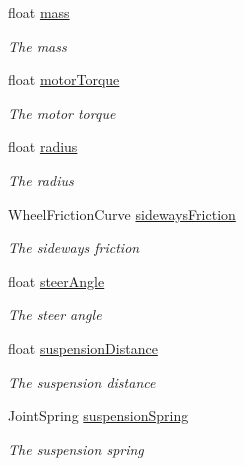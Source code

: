 \begin{DoxyCompactItemize}
float \hyperlink{class_serialize_wheel_collider_1_1_stored_information_a90f8bee727dedaea08f403b696dca2f7}{mass}
\begin{DoxyCompactList}\small\item\em The mass \end{DoxyCompactList}\item 
float \hyperlink{class_serialize_wheel_collider_1_1_stored_information_acbf3d9857300e788a48b1519f37a35db}{motor\+Torque}
\begin{DoxyCompactList}\small\item\em The motor torque \end{DoxyCompactList}\item 
float \hyperlink{class_serialize_wheel_collider_1_1_stored_information_ad711208a1a46bfcd8c75cc5addf799f4}{radius}
\begin{DoxyCompactList}\small\item\em The radius \end{DoxyCompactList}\item 
Wheel\+Friction\+Curve \hyperlink{class_serialize_wheel_collider_1_1_stored_information_ab725f43f8c5e1f50539391be1c42477a}{sideways\+Friction}
\begin{DoxyCompactList}\small\item\em The sideways friction \end{DoxyCompactList}\item 
float \hyperlink{class_serialize_wheel_collider_1_1_stored_information_a40eb4138ed9d42574ada5f91fb752e12}{steer\+Angle}
\begin{DoxyCompactList}\small\item\em The steer angle \end{DoxyCompactList}\item 
float \hyperlink{class_serialize_wheel_collider_1_1_stored_information_ac4e026c0f19afa9bd367a5143495ab8f}{suspension\+Distance}
\begin{DoxyCompactList}\small\item\em The suspension distance \end{DoxyCompactList}\item 
Joint\+Spring \hyperlink{class_serialize_wheel_collider_1_1_stored_information_a54af5bc7641d229df84dd46097804ef2}{suspension\+Spring}
\begin{DoxyCompactList}\small\item\em The suspension spring \end{DoxyCompactList}\end{DoxyCompactItemize}



